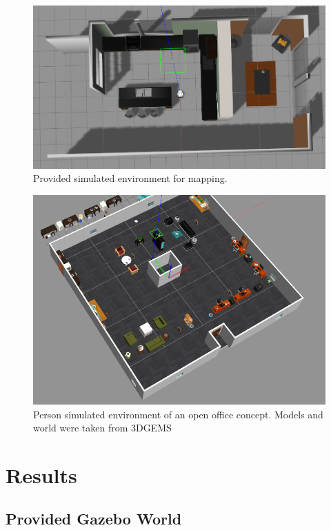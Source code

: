 \documentclass[10pt,journal,compsoc]{IEEEtran}
\begin{document}
\begin{figure}[thpb]
      \centering
      \includegraphics[width=\linewidth]{../img/gazebo_kitchen.png}
      \caption{Provided simulated environment for mapping.}
      \label{fig:gazebokitchen}
\end{figure}

\begin{figure}[thpb]
      \centering
      \includegraphics[width=\linewidth]{../img/gazebo_office.png}
      \caption{Person simulated environment of an open office concept. Models and world were taken from 3DGEMS \cite{3DGems}}
      \label{fig:gazebooffice}
\end{figure}


\section{Results}
\label{sec:results}


\subsection{Provided Gazebo World}
\label{subsec:kitchenworld}
\end{document}
